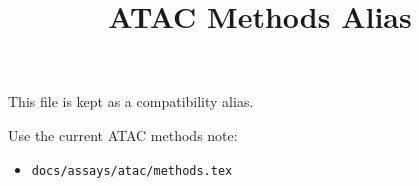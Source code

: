 \documentclass[11pt]{article}
\title{ATAC Methods Alias}
\author{}
\date{}
\begin{document}
\maketitle

This file is kept as a compatibility alias.

Use the current ATAC methods note:
\begin{itemize}
\item \texttt{docs/assays/atac/methods.tex}
\end{itemize}
\end{document}
